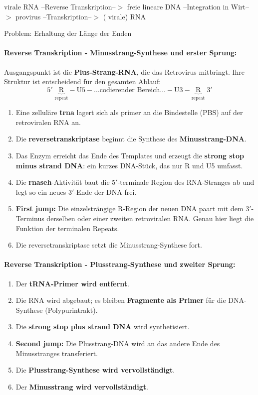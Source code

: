 \begin{center}
    virale RNA --Reverse Transkription--$>$ freie lineare DNA --Integration in Wirt--$>$ \gls{provirus} --Transkription--$>$ (
    virale) RNA
\end{center}
Problem: Erhaltung der Länge der Enden

\paragraph{Reverse Transkription - Minusstrang-Synthese und erster Sprung:}
Ausgangspunkt ist die \textbf{Plus-Strang-RNA}, die das Retrovirus mitbringt.
Ihre Struktur ist entscheidend für den gesamten Ablauf:
\[
    5'\; \underbrace{\text{R}}_{\text{repeat}} - \text{U5} -
    \dots \text{codierender Bereich} \dots - \text{U3} -
    \underbrace{\text{R}}_{\text{repeat}} \;3'
\]
\begin{enumerate}
    \item Eine zelluläre \textbf{trna} lagert sich als \gls{primer} an die
    Bindestelle (PBS) auf der retroviralen RNA an.
    \item Die \textbf{\gls{reversetranskriptase}} beginnt die Synthese des
    \textbf{Minusstrang-DNA}.
    \item Das Enzym erreicht das Ende des Templates und erzeugt die
    \textbf{strong stop minus strand DNA}: ein kurzes DNA-Stück, das nur
    R und U5 umfasst.
    \item Die \textbf{\gls{rnaseh}}-Aktivität baut die 5$'$-terminale Region des
    RNA-Stranges ab und legt so ein neues 3$'$-Ende der DNA frei.
    \item \textbf{First jump:} Die einzelsträngige R-Region der neuen DNA paart
    mit dem 3$'$-Terminus derselben oder einer zweiten retroviralen RNA\@.
    Genau hier liegt die Funktion der terminalen Repeats.
    \item Die \gls{reversetranskriptase} setzt die Minusstrang-Synthese fort.
\end{enumerate}

\paragraph{Reverse Transkription - Plusstrang-Synthese und zweiter Sprung:}

\begin{enumerate}
    \item Der \textbf{tRNA-Primer wird entfernt}.
    \item Die RNA wird abgebaut; es bleiben \textbf{Fragmente als Primer} für die
    DNA-Synthese (Polypurintrakt).
    \item Die \textbf{strong stop plus strand DNA} wird synthetisiert.
    \item \textbf{Second jump:} Die Plusstrang-DNA wird an das andere Ende des
    Minusstranges transferiert.
    \item Die \textbf{Plusstrang-Synthese wird vervollständigt}.
    \item Der \textbf{Minusstrang wird vervollständigt}.
\end{enumerate}

